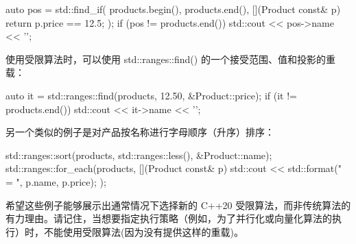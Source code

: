 \begin{cpp}
auto pos = std::find_if(
    products.begin(), products.end(),
    [](Product const& p) { return p.price == 12.5; });
if (pos != products.end())
    std::cout << pos->name << '\n';
\end{cpp}

使用受限算法时，可以使用 std::ranges::find() 的一个接受范围、值和投影的重载：

\begin{cpp}
auto it = std::ranges::find(products, 12.50, &Product::price);
if (it != products.end())
    std::cout << it->name << '\n';
\end{cpp}

另一个类似的例子是对产品按名称进行字母顺序（升序）排序：

\begin{cpp}
std::ranges::sort(products, std::ranges::less(), &Product::name);
std::ranges::for_each(products, [](Product const& p) {
    std::cout << std::format("{} = {}\n", p.name, p.price); });
\end{cpp}

希望这些例子能够展示出通常情况下选择新的 C++20 受限算法，而非传统算法的有力理由。请记住，当想要指定执行策略（例如，为了并行化或向量化算法的执行）时，不能使用受限算法(因为没有提供这样的重载)。


